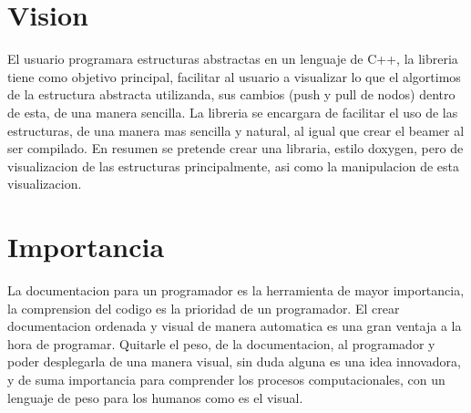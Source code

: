 \documentclass[]{article}
\begin{document}


\entitle{\\}





\section{Vision}
 
El usuario programara estructuras abstractas en un lenguaje de C++, la libreria tiene como objetivo principal, facilitar al usuario a visualizar lo que el algortimos de la estructura abstracta utilizanda, sus cambios (push y pull de nodos) dentro de esta, de una manera sencilla. La libreria se encargara de facilitar el uso de las estructuras,  de una manera mas sencilla y natural, al igual que crear el beamer al ser compilado. En resumen se pretende crear una libraria, estilo doxygen, pero de visualizacion de las estructuras principalmente, asi como la manipulacion de esta visualizacion.

\section{Importancia}

La documentacion para un programador es la herramienta de mayor importancia, la comprension del codigo es la prioridad de un programador. El crear documentacion ordenada y visual de manera automatica es una gran ventaja a la hora de programar. Quitarle el peso, de la documentacion, al programador y poder desplegarla de una manera visual, sin duda alguna es una idea innovadora, y de suma importancia para comprender los procesos computacionales, con un lenguaje de peso para los humanos como es el visual.
\end{document}
